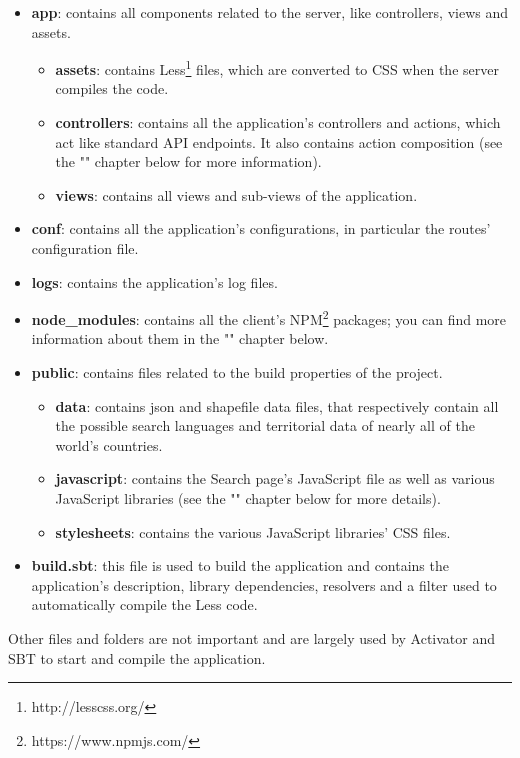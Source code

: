 \documentclass[a4paper,11pt]{report}
\begin{document}
\begin{itemize}
\item \textbf{app}: contains all components related to the server, like controllers, views and assets.
	\begin{itemize}
	\item \textbf{assets}: contains Less\footnote{http://lesscss.org/} files, which are converted to CSS when the server compiles the code.
	\item \textbf{controllers}: contains all the application's controllers and actions, which act like standard API endpoints. It also contains action composition (see the "" chapter below for more information).
	\item \textbf{views}: contains all views and sub-views of the application.
	\end{itemize}
\item \textbf{conf}: contains all the application's configurations, in particular the routes' configuration file.
\item \textbf{logs}: contains the application's log files.
\item \textbf{node\_modules}: contains all the client's NPM\footnote{https://www.npmjs.com/} packages; you can find more information about them in the "" chapter below.
\item \textbf{public}: contains files related to the build properties of the project.
	\begin{itemize}
	\item \textbf{data}: contains json and shapefile data files, that respectively contain all the possible search languages and territorial data of nearly all of the world's countries.
	\item \textbf{javascript}: contains the Search page's JavaScript file as well as various JavaScript libraries (see the "" chapter below for more details).
	\item \textbf{stylesheets}: contains the various JavaScript libraries' CSS files.
	\end{itemize}
\item \textbf{build.sbt}: this file is used to build the application and contains the application's description, library dependencies, resolvers and a filter used to automatically compile the Less code.
\end{itemize}
Other files and folders are not important and are largely used by Activator and SBT to start and compile the application.
\newpage
\end{document}
